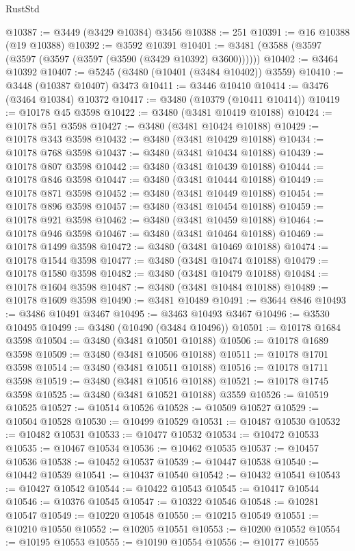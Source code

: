 \begin{lexlean}{RustStd}
\begin{coremodule}
{{{{{{{{{{{{{{{{{{{@10387 := @3449 (@3429 @10384) @3456
@10388 := 251
@10391 := @16 @10388 (@19 @10388)
@10392 := @3592 @10391
@10401 := @3481 (@3588 (@3597 (@3597 (@3597 (@3597 (@3590 (@3429 @10392) @3600))))))
@10402 := @3464 @10392
@10407 := @5245 (@3480 (@10401 (@3484 @10402)) @3559)
@10410 := @3448 (@10387 @10407) @3473
@10411 := @3446 @10410
@10414 := @3476 (@3464 @10384) @10372
@10417 := @3480 (@10379 (@10411 @10414))
@10419 := @10178 @45 @3598
@10422 := @3480 (@3481 @10419 @10188)
@10424 := @10178 @51 @3598
@10427 := @3480 (@3481 @10424 @10188)
@10429 := @10178 @343 @3598
@10432 := @3480 (@3481 @10429 @10188)
@10434 := @10178 @768 @3598
@10437 := @3480 (@3481 @10434 @10188)
@10439 := @10178 @807 @3598
@10442 := @3480 (@3481 @10439 @10188)
@10444 := @10178 @846 @3598
@10447 := @3480 (@3481 @10444 @10188)
@10449 := @10178 @871 @3598
@10452 := @3480 (@3481 @10449 @10188)
@10454 := @10178 @896 @3598
@10457 := @3480 (@3481 @10454 @10188)
@10459 := @10178 @921 @3598
@10462 := @3480 (@3481 @10459 @10188)
@10464 := @10178 @946 @3598
@10467 := @3480 (@3481 @10464 @10188)
@10469 := @10178 @1499 @3598
@10472 := @3480 (@3481 @10469 @10188)
@10474 := @10178 @1544 @3598
@10477 := @3480 (@3481 @10474 @10188)
@10479 := @10178 @1580 @3598
@10482 := @3480 (@3481 @10479 @10188)
@10484 := @10178 @1604 @3598
@10487 := @3480 (@3481 @10484 @10188)
@10489 := @10178 @1609 @3598
@10490 := @3481 @10489
@10491 := @3644 @846
@10493 := @3486 @10491 @3467
@10495 := @3463 @10493 @3467
@10496 := @3530 @10495
@10499 := @3480 (@10490 (@3484 @10496))
@10501 := @10178 @1684 @3598
@10504 := @3480 (@3481 @10501 @10188)
@10506 := @10178 @1689 @3598
@10509 := @3480 (@3481 @10506 @10188)
@10511 := @10178 @1701 @3598
@10514 := @3480 (@3481 @10511 @10188)
@10516 := @10178 @1711 @3598
@10519 := @3480 (@3481 @10516 @10188)
@10521 := @10178 @1745 @3598
@10525 := @3480 (@3481 @10521 @10188) @3559
@10526 := @10519 @10525
@10527 := @10514 @10526
@10528 := @10509 @10527
@10529 := @10504 @10528
@10530 := @10499 @10529
@10531 := @10487 @10530
@10532 := @10482 @10531
@10533 := @10477 @10532
@10534 := @10472 @10533
@10535 := @10467 @10534
@10536 := @10462 @10535
@10537 := @10457 @10536
@10538 := @10452 @10537
@10539 := @10447 @10538
@10540 := @10442 @10539
@10541 := @10437 @10540
@10542 := @10432 @10541
@10543 := @10427 @10542
@10544 := @10422 @10543
@10545 := @10417 @10544
@10546 := @10376 @10545
@10547 := @10322 @10546
@10548 := @10281 @10547
@10549 := @10220 @10548
@10550 := @10215 @10549
@10551 := @10210 @10550
@10552 := @10205 @10551
@10553 := @10200 @10552
@10554 := @10195 @10553
@10555 := @10190 @10554
@10556 := @10177 @10555
}}}}}}}}}}}}}}}}}}}
\end{coremodule}
\end{lexlean}

